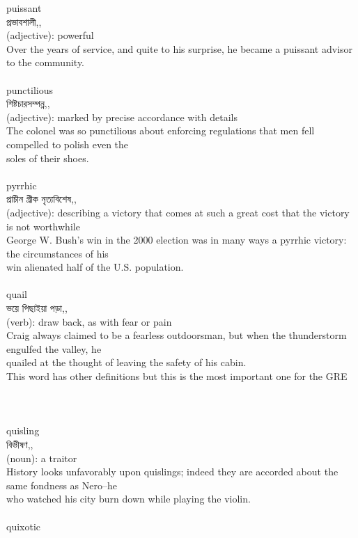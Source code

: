 \documentclass{article}
\begin{document}
{{puissant}\\
{প্রভাবশালী,,}\\
{(adjective): powerful\\Over the years of service, and quite to his surprise, he became a puissant advisor to the community.\\}\\
{punctilious}\\
{শিষ্টচারসম্পন্ন,,}\\
{(adjective): marked by precise accordance with details\\The colonel was so punctilious about enforcing regulations that men fell compelled to polish even the\\soles of their shoes.\\}\\
{pyrrhic}\\
{প্রাচীন গ্রীক নৃত্যবিশেষ,,}\\
{(adjective): describing a victory that comes at such a great cost that the victory is not worthwhile\\George W. Bush's win in the 2000 election was in many ways a pyrrhic victory: the circumstances of his\\win alienated half of the U.S. population.\\}\\
{quail}\\
{ভয়ে পিছাইয়া পড়া,,}\\
{(verb): draw back, as with fear or pain\\Craig always claimed to be a fearless outdoorsman, but when the thunderstorm engulfed the valley, he\\quailed at the thought of leaving the safety of his cabin.\\This word has other definitions but this is the most important one for the GRE\\\\                                                                                 \\}\\
{quisling}\\
{বিভীষণ,,}\\
{(noun): a traitor\\History looks unfavorably upon quislings; indeed they are accorded about the same fondness as Nero--he\\who watched his city burn down while playing the violin.\\}\\
{quixotic}\\
}
\end{document}
